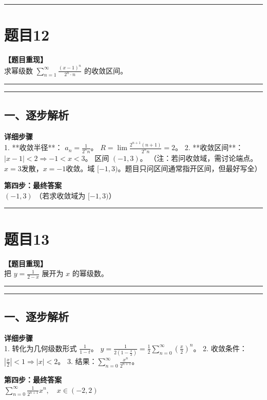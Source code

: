 \documentclass[12pt, a4paper]{ctexart}
\newcommand{\TopSeparator}{
    \par\noindent\rule{\textwidth}{1.5pt}\vspace{0.5em} %
}
\newcommand{\AnalysisSeparator}{
    \par\noindent\rule{\textwidth}{0.5pt}\vspace{0.2em}\hrule\vspace{0.5em} %
}
\newenvironment{RedAnalysis}{
    \par
    \color{red} %
}{
    \par
    \color{black} %
}
\begin{document}
\vspace{2em}

\TopSeparator
\section*{题目12}

\textbf{【题目重现】} \\
求幂级数 $ \sum_{n=1}^{\infty} \frac{(x-1)^{n}}{2^{n} \cdot n} $ 的收敛区间。

\AnalysisSeparator

\begin{RedAnalysis}

\subsection*{一、逐步解析}

\textbf{详细步骤} \\
1. **收敛半径**：
   $a_n = \frac{1}{2^n n}$。
   $R = \lim \frac{2^{n+1}(n+1)}{2^n n} = 2$。
2. **收敛区间**：
   $|x-1| < 2 \Rightarrow -1 < x < 3$。
   区间 $(-1, 3)$。
   （注：若问收敛域，需讨论端点。$x=3$发散，$x=-1$收敛。域 $[-1,3)$。题目只问区间通常指开区间，但最好写全）

\textbf{第四步：最终答案} \\
$ (-1, 3) $ （若求收敛域为 $[-1, 3)$）

\end{RedAnalysis}

\vspace{2em}

\TopSeparator
\section*{题目13}

\textbf{【题目重现】} \\
把 $ y = \frac{1}{2-x} $ 展开为 $x$ 的幂级数。

\AnalysisSeparator

\begin{RedAnalysis}

\subsection*{一、逐步解析}

\textbf{详细步骤} \\
1. 转化为几何级数形式 $\frac{1}{1-t}$。
   $y = \frac{1}{2(1 - \frac{x}{2})} = \frac{1}{2} \sum_{n=0}^\infty (\frac{x}{2})^n$。
2. 收敛条件：$|\frac{x}{2}| < 1 \Rightarrow |x| < 2$。
3. 结果：$\sum_{n=0}^\infty \frac{x^n}{2^{n+1}}$。

\textbf{第四步：最终答案} \\
$ \sum_{n=0}^\infty \frac{1}{2^{n+1}} x^n, \quad x \in (-2, 2) $

\end{RedAnalysis}
\end{document}
